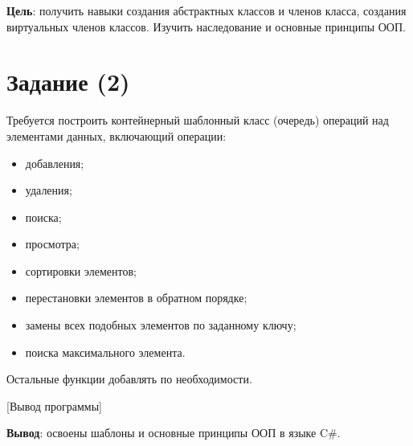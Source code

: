 \documentclass{bsuir}
\newcommand{\csharp}{C{\liberationrm\#}}
\begin{document}
\maketitle
\mainmatter
\renewcommand{\thefigure}{\arabic{figure}}
\renewcommand{\thelisting}{\arabic{listing}}

\textbf{Цель}: получить навыки создания абстрактных классов и членов класса,
создания виртуальных членов классов. Изучить наследование и основные принципы
ООП.

\section*{Задание (2)}

Требуется построить контейнерный шаблонный класс (очередь) операций над
элементами данных, включающий операции:

\begin{itemize}
    \item добавления;
    \item удаления;
    \item поиска;
    \item просмотра;
    \item сортировки элементов;
    \item перестановки элементов в обратном порядке;
    \item замены всех подобных элементов по заданному ключу;
    \item поиска максимального элемента.
\end{itemize}

Остальные функции добавлять по необходимости.


[Вывод программы]

\textbf{Вывод}: освоены шаблоны и основные принципы ООП в языке \csharp.
\end{document}
